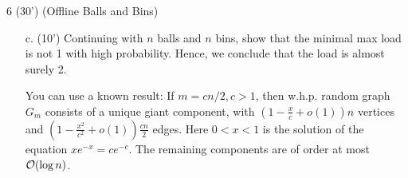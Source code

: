 \begin{question}{6 (30') (Offline Balls and Bins)}
\begin{itemize}
    \item [c. (10')] Continuing with $n$ balls and $n$ bins, show that the minimal max load is not 1 with high probability. Hence, we conclude that the load is almost surely 2.
    
    You can use a known result: %
    If $m = cn/2, c>1$, then w.h.p. random graph $G_m$ consists of a unique giant component, with $(1 - \frac{x}{c} + o(1)) n$ vertices and $( 1 - \frac{x^2}{c^2} + o(1)) \frac{cn}{2}$ edges. 
    Here $0 < x < 1$ is the solution of the equation $xe^{-x} = ce^{-c}$. The remaining components  are of order at most $\order{\log n}$.
\end{itemize}
\end{question}

